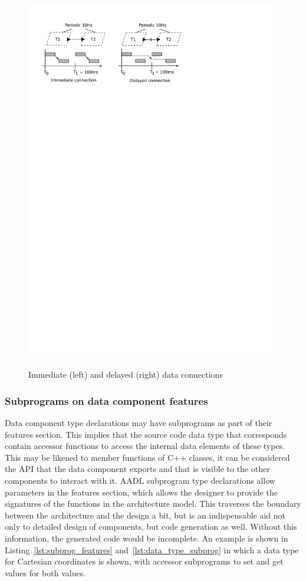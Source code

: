 \begin{figure}
\centering
\includegraphics[scale=0.75]{figs/conn_semantics}
\label{fig:conn_semantics}
\caption{Immediate (left) and delayed (right) data connections}
\end{figure}

\subsubsection{Subprograms on data component features}
Data component type declarations may have subprograms as part of their
features section. This implies that the source code data type that
corresponds contain accessor functions to access the internal data
elements of these types. This may be likened to member functions of
C++ classes, it can be considered the API that the data component
exports and that is visible to the other components to interact with
it. AADL subprogram type declarations allow parameters in the features
section, which allows the designer to provide the signatures of the
functions in the architecture model. This traverses the boundary
between the architecture and the design a bit, but is an indispensable
aid not only to detailed design of components, but code generation as
well. Without this information, the generated code would be
incomplete. An example is shown in Listing~\ref{lst:subprog_features}
and~\ref{lst:data_type_subprog} in which a data type for Cartesian
coordinates is shown, with accessor subprograms to set and get values
for both values.


